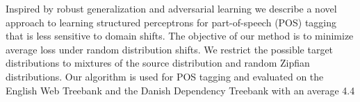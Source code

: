 Inspired by robust generalization and adversarial learning we describe a novel approach to learning structured perceptrons for part-of-speech (POS) tagging
 that is less sensitive to domain shifts. The objective of our method is to
 minimize average loss under random distribution shifts. We restrict the
 possible target distributions to mixtures of the source distribution and random
 Zipfian distributions. Our algorithm is used for POS tagging and evaluated on
 the English Web Treebank and the Danish Dependency Treebank with an average
 4.4%

